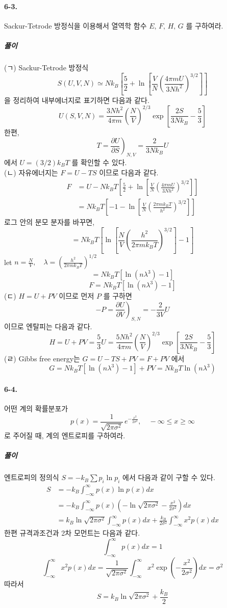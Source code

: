 \documentclass[a4paper,12pt]{report}
\newcommand{\Maxwell}[3][]{\left.\frac{\partial #2}{\partial #3} \right)_{#1} }
\begin{document}
	\paragraph{6-3. } Sackur-Tetrode 방정식을 이용해서 열역학 함수 $E,\,F,\,H,\,G$ 를 구하여라.
	\subparagraph{풀이} (ㄱ) Sackur-Tetrode 방정식
	$$S(U,V,N)\simeq Nk_B\left[\frac{5}{2}+\ln\left[\frac{V}{N}\left(\frac{4\pi mU}{3Nh^2} \right)^{3/2}  \right]  \right]$$
	을 정리하여 내부에너지로 표기하면 다음과 같다.
	$$U(S,V,N)=\frac{3Nh^2}{4\pi m}\left(\frac{N}{V} \right)^{2/3}\exp\left[\frac{2S}{3Nk_B}-\frac{5}{3} \right]  $$
	한편,
	$$T=\Maxwell[N,V]{U}{S}=\frac{2}{3Nk_B}U$$ 에서 $U=(3/2)k_BT$ 를 확인할 수 있다. \\
	(ㄴ) 자유에너지는 $F=U-TS$ 이므로 다음과 같다.
	\begin{equation*}
		\begin{split}
		F&=U-Nk_BT\left[\frac{5}{2}+\ln\left[\frac{V}{N}\left(\frac{4\pi mU}{3Nh^2} \right)^{3/2}  \right]   \right] \\
		&=Nk_BT\left[-1-\ln\left[\frac{V}{N}\left(\frac{2\pi m k_B T}{h^2} \right)^{3/2} \right]  \right] 
		\end{split}
	\end{equation*}
	로그 안의 분모 분자를 바꾸면,
	$$=Nk_BT\left[\ln\left[\frac{N}{V}\left(\frac{h^2}{2\pi m k_B T} \right)^{3/2} \right]  -1\right]$$
	let $n=\frac{N}{V}, \quad \lambda=\left(\frac{h^2}{2\pi m k_B T} \right)^{1/2} $ 
	$$=Nk_BT\left[\ln(n \lambda ^{3} )  -1\right]$$
	$$F=Nk_BT\left[\ln(n \lambda ^{3} )  -1\right]$$
	(ㄷ) $H=U+PV$ 이므로 먼저 $P$ 를 구하면
	$$-P=\Maxwell[S,N]{U}{V}=-\frac{2}{3V}U$$
	이므로 엔탈피는 다음과 같다. 
	$$H=U+PV=\frac{5}{3}U=\frac{5Nh^2}{4\pi m}\left(\frac{N}{V} \right)^{2/3}\exp\left[\frac{2S}{3Nk_B}-\frac{5}{3} \right]  $$
	(ㄹ) Gibbs free energy는 $G=U-TS+PV=F+PV$ 에서
	$$G=Nk_BT[\ln(n\lambda^3)-1]+PV=Nk_BT\ln(n\lambda^3)$$
	\paragraph{6-4. } 어떤 계의 확률분포가 
	$$p(x)=\frac{1}{\sqrt{2\pi \sigma^2}}\,e^{-\frac{x^2}{2\sigma^2}},\quad -\infty\le x \ge \infty$$
	로 주어질 때, 계의 엔트로피를 구하여라. 
	\subparagraph{풀이} 엔트로피의 정의식 $S=-k_B\sum p_i \ln p_i$ 에서 다음과 같이 구할 수 있다. 
	\begin{equation*}
		\begin{split}
		S&=-k_B\int_{-\infty}^{\infty}p(x)\ln p(x) dx\\
		&=-k_B\int_{-\infty}^{\infty}p(x)\left(-\ln\sqrt{2\pi\sigma^2}-\frac{x^2}{2\sigma^2} \right) dx\\
		&=k_B\ln\sqrt{2\pi \sigma^2}\int_{-\infty}^{\infty}p(x)dx+\frac{k_B}{2\sigma^2}\int_{-\infty}^{\infty}x^2p(x)dx
		\end{split}
	\end{equation*}
	한편 규격과조건과 2차 모먼트는 다음과 같다.
	$$\int_{-\infty}^{\infty}p(x)dx=1$$
	$$\int_{-\infty}^{\infty}x^2p(x)dx=\frac{1}{\sqrt{2\pi\sigma^2}}\int_{-\infty}^{\infty}x^2\exp\left(-\frac{x^2}{2\sigma^2} \right)dx=\sigma^2 $$
	따라서
	$$S=k_B\ln\sqrt{2\pi\sigma^2}+\frac{k_B}{2}$$
\end{document}
